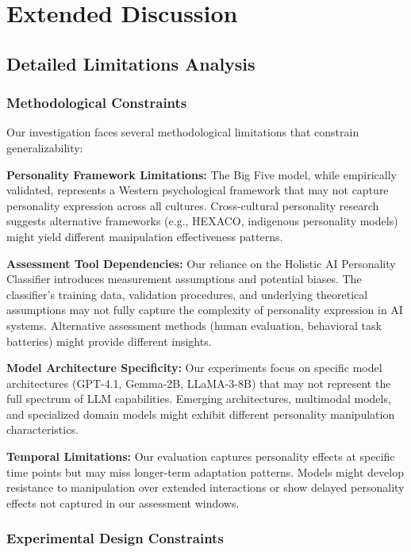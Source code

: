 \section{Extended Discussion}
\label{app:discussion-extended}

\subsection{Detailed Limitations Analysis}

\subsubsection{Methodological Constraints}

Our investigation faces several methodological limitations that constrain generalizability:

\textbf{Personality Framework Limitations:} The Big Five model, while empirically validated, represents a Western psychological framework that may not capture personality expression across all cultures. Cross-cultural personality research suggests alternative frameworks (e.g., HEXACO, indigenous personality models) might yield different manipulation effectiveness patterns.

\textbf{Assessment Tool Dependencies:} Our reliance on the Holistic AI Personality Classifier introduces measurement assumptions and potential biases. The classifier's training data, validation procedures, and underlying theoretical assumptions may not fully capture the complexity of personality expression in AI systems. Alternative assessment methods (human evaluation, behavioral task batteries) might provide different insights.

\textbf{Model Architecture Specificity:} Our experiments focus on specific model architectures (GPT-4.1, Gemma-2B, LLaMA-3-8B) that may not represent the full spectrum of LLM capabilities. Emerging architectures, multimodal models, and specialized domain models might exhibit different personality manipulation characteristics.

\textbf{Temporal Limitations:} Our evaluation captures personality effects at specific time points but may miss longer-term adaptation patterns. Models might develop resistance to manipulation over extended interactions or show delayed personality effects not captured in our assessment windows.

\subsubsection{Experimental Design Constraints}

